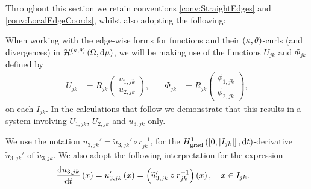 Throughout this section we retain conventions \ref{conv:StraightEdges} and \ref{conv:LocalEdgeCoords}, whilst also adopting the following:
\begin{convention} \label{conv:RotatedComponents}
	When working with the edge-wise forms for functions and their $\left( \kappa, \theta \right)$-curls (and divergences) in $\mathcal{H}^{\left( \kappa, \theta \right)}\left( \Omega, \mathrm{d}\mu \right)$, we will be making use of the functions $U_{jk}$ and $\Phi_{jk}$ defined by
	\begin{align*}
		U_{jk} &= R_{jk}\begin{pmatrix} u_{1,jk} \\ u_{2,jk} \end{pmatrix}, 
		&\quad
		\Phi_{jk} &= R_{jk}\begin{pmatrix} \phi_{1,jk} \\ \phi_{2,jk} \end{pmatrix},
	\end{align*}
	on each $I_{jk}$.
	In the calculations that follow we demonstrate that this results in a system involving $U_{1,jk}$, $U_{2,jk}$ and $u_{3,jk}$ only.
\end{convention}
\begin{convention} \label{conv:DerivLikeNotation}
	We use the notation $u_{3,jk}' = \widetilde{u}_{3,jk}' \circ r_{jk}^{-1}$, for the $H^1_\mathrm{grad}\left( \left[ 0,\left\lvert I_{jk} \right\rvert \right], \mathrm{d}t \right)$-derivative $\widetilde{u}_{3,jk}'$ of $\widetilde{u}_{3,jk}$.
	We also adopt the following interpretation for the expression
	\begin{align*}
		\dfrac{\mathrm{d}u_{3,jk}}{\mathrm{d}t}\left( x \right) &= u_{3,jk}'\left( x \right) = \left( \widetilde{u}_{3,jk}' \circ r_{jk}^{-1} \right)\left( x \right), \quad x\in I_{jk}.
	\end{align*}
\end{convention} 


